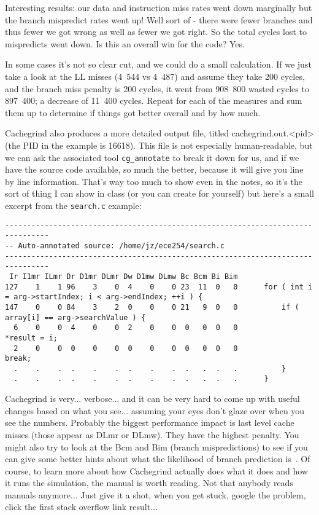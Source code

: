 Interesting results: our data and instruction miss rates went down marginally but the branch mispredict rates went up! Well sort of - there were fewer branches and thus fewer we got wrong as well as fewer we got right. So the total cycles lost to mispredicts went down. Is this an overall win for the code? Yes. 

In some cases it's not so clear cut, and we could do a small calculation. If we just take a look at the LL misses (4~544 vs 4~487) and assume they take 200 cycles, and the branch miss penalty is 200 cycles, it went from 908~800 wasted cycles to 897~400; a decrease of 11~400 cycles. Repeat for each of the measures and sum them up to determine if things got better overall and by how much.

Cachegrind also produces a more detailed output file, titled cachegrind.out.<pid> (the PID in the example is 16618). This file is not especially human-readable, but we can ask the associated tool \texttt{cg\_annotate} to break it down for us, and if we have the source code available, so much the better, because it will give you line by line information. That's way too much to show even in the notes, so it's the sort of thing I can show in class (or you can create for yourself) but here's a small excerpt from the \texttt{search.c} example:



{\scriptsize
\begin{verbatim}
--------------------------------------------------------------------------------
-- Auto-annotated source: /home/jz/ece254/search.c
--------------------------------------------------------------------------------
 Ir I1mr ILmr Dr D1mr DLmr Dw D1mw DLmw Bc Bcm Bi Bim 
127    1    1 96    3    0  4    0    0 23  11  0   0      for ( int i = arg->startIndex; i < arg->endIndex; ++i ) {
147    0    0 84    3    2  0    0    0 21   9  0   0          if ( array[i] == arg->searchValue ) {
  6    0    0  4    0    0  2    0    0  0   0  0   0              *result = i;
  2    0    0  0    0    0  0    0    0  0   0  0   0              break;
  .    .    .  .    .    .  .    .    .  .   .  .   .          }
  .    .    .  .    .    .  .    .    .  .   .  .   .      }
\end{verbatim}
}

Cachegrind is very... verbose... and it can be very hard to come up with useful changes based on what you see... assuming your eyes don't glaze over when you see the numbers. Probably the biggest performance impact is last level cache misses (those appear as DLmr or DLmw). They have the highest penalty. You might also try to look at the Bcm and Bim (branch mispredictions) to see if you can give some better hints about what the likelihood of branch prediction is~\cite{cachegrind}. Of course, to learn more about how Cachegrind actually does what it does and how it runs the simulation, the manual is worth reading. Not that anybody reads manuals anymore... Just give it a shot, when you get stuck, google the problem, click the first stack overflow link result...




